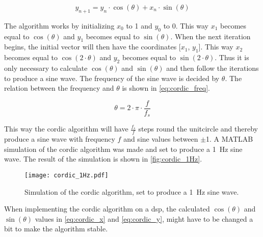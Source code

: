 \begin{equation}
\label{eq:cordic_y}
		y_{n+1} = y_n \cdot \cos(\theta) + x_n \cdot \sin(\theta) 
\end{equation}
\startexplain
\stopexplain

The algorithm works by initializing $x_0$ to 1 and $y_0$ to 0. This way $x_1$ becomes equal to $\cos(\theta)$ and $y_1$ becomes equal to $\sin(\theta)$. When the next iteration begins, the initial vector will then have the coordinates [$x_1$, $y_1$]. This way $x_2$ becomes equal to $\cos(2 \cdot \theta)$ and $y_2$ becomes equal to $\sin(2 \cdot \theta)$. Thus it is only necessary to calculate $\cos(\theta)$ and $\sin(\theta)$ and then follow the iterations to produce a sine wave. The frequency of the sine wave is decided by $\theta$. The relation between the frequency and $\theta$ is shown in \autoref{eq:cordic_freq}.

\begin{equation}
\label{eq:cordic_freq}
		\theta = 2 \cdot \pi \cdot \frac{f}{f_s} 
\end{equation}
\startexplain
\stopexplain 

This way the \gls{cordic} algorithm will have $\frac{f_s}{f}$ steps round the unitcircle and thereby produce a sine wave with frequency $f$ and sine values between $\pm$1.
A MATLAB simulation of the \gls{cordic} algorithm was made and set to produce a \SI{1}{\hertz} sine wave. The result of the simulation is shown in \autoref{fig:cordic_1Hz}.

\begin{figure}[!h]
    \centering
        \texttt{[image: cordic\_1Hz.pdf]}
        \caption{Simulation of the \gls{cordic} algorithm, set to produce a \SI{1}{\hertz} sine wave.}
        \label{fig:cordic_1Hz}
  \end{figure}
  
When implementing the \gls{cordic} algorithm on a \gls{dsp}, the calculated $\cos(\theta)$ and $\sin(\theta)$ values in \autoref{eq:cordic_x} and \autoref{eq:cordic_y}, might have to be changed a bit to make the algorithm stable. 

